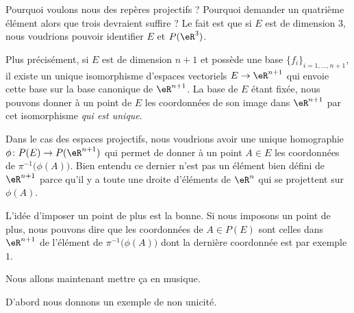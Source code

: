 \begin{normaltext}
	Pourquoi voulons nous des repères projectifs ? Pourquoi demander un quatrième élément alors que trois devraient suffire ? Le fait est que si \( E\) est de dimension \( 3\), nous voudrions pouvoir identifier \( E\) et \( P(\eR^3)\).

	Plus précisément, si \( E\) est de dimension \( n+1\) et possède une base \( \{ f_i \}_{i=1,\ldots, n+1}\), il existe un unique isomorphisme d'espaces vectoriels \( E\to \eR^{n+1}\) qui envoie cette base sur la base canonique de \( \eR^{n+1}\). La base de \( E\) étant fixée, nous pouvons donner à un point de \( E\) les coordonnées de son image dans \( \eR^{n+1}\) par cet isomorphisme \emph{qui est unique}.

	Dans le cas des espaces projectifs, nous voudrions avoir une unique homographie \( \phi\colon P(E)\to P(\eR^{n+1})\) qui permet de donner à un point \( A\in E\) les coordonnées de \( \pi^{-1}\big( \phi(A) \big)\). Bien entendu ce dernier n'est pas un élément bien défini de \( \eR^{n+1}\) parce qu'il y a toute une droite d'éléments de \( \eR^n\) qui se projettent sur \( \phi(A)\).

	L'idée d'imposer un point de plus est la bonne. Si nous imposons un point de plus, nous pouvons dire que les coordonnées de \( A\in P(E)\) sont celles dans \( \eR^{n+1}\) de l'élément de \( \pi^{-1}\big( \phi(A) \big)\) dont la dernière coordonnée est par exemple \( 1\).

	Nous allons maintenant mettre ça en musique.
\end{normaltext}

D'abord nous donnons un exemple de non unicité.

